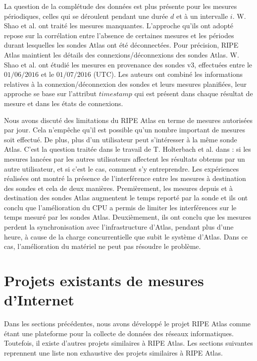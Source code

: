 La question de la complétude des données est plus présente pour les mesures périodiques, celles qui se déroulent pendant une durée $d$ et à un intervalle $i$. W. Shao et al.  \cite{DBLP:journals/corr/ShaoRDV17} ont traité les mesures manquantes.  L'approche qu'ils ont adopté repose sur la corrélation entre  l'absence de certaines mesures et les périodes durant lesquelles les sondes Atlas ont été déconnectées. Pour précision, RIPE Atlas maintient les détails des connexions/déconnexions des sondes Atlas. W. Shao et al.  \cite{DBLP:journals/corr/ShaoRDV17}  ont étudié les mesures en provenance des  sondes v$3$, effectuées entre le $01/06/2016$ et  le $01/07/2016$ (UTC). Les auteurs ont combiné les informations relatives à la connexion/déconnexion des sondes et leurs mesures planifiées, leur approche se base sur l'attribut $timestamp$ qui est présent dans chaque résultat de mesure et dans les états de connexions.


Nous avons discuté des limitations du RIPE Atlas en terme de mesures autorisées par jour. Cela n'empêche qu'il est possible qu'un nombre important de mesures  soit effectué. De plus, plus d'un utilisateur peut s'intéresser à la même sonde Atlas. C'est la question traitée dans le travail de T. Holterbach et al. dans \cite{Holterbach:2015:QIM:2815675.2815710}: si les mesures lancées par les autres utilisateurs affectent les résultats obtenus par un autre utilisateur, et si c'est le cas, comment s'y entreprendre. Les expériences réalisées ont montré la présence de l'interférence entre les mesures à destination des sondes et cela de deux manières. Premièrement, les mesures depuis et à destination des sondes Atlas augmentent le temps reporté par la sonde et ils ont conclu que l'amélioration du CPU a permis de limiter les interférences sur le temps mesuré par les sondes Atlas. Deuxièmement,  ils ont conclu que les mesures perdent la synchronisation avec l'infrastructure d'Atlas, pendant plus d'une heure, à cause de la charge concurrentielle que subit le système d'Atlas. Dans ce cas, l'amélioration du matériel ne peut pas résoudre le problème.



\section{Projets existants de mesures d'Internet}

Dans les sections précédentes, nous avons développé  le projet RIPE Atlas comme étant une plateforme pour la collecte de données des réseaux informatiques.  Toutefois, il existe d'autres projets similaires à RIPE Atlas. Les sections suivantes reprennent une liste non exhaustive des projets similaires  à RIPE Atlas.

